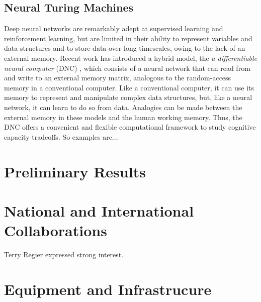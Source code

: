 \documentclass{article}
\begin{document}
\subsection{Neural Turing Machines}
Deep neural networks are remarkably adept at supervised learning and reinforcement learning, but are limited in their ability to represent variables and data structures and to store data over long timescales, owing to the lack of an external memory. Recent work has introduced a hybrid model, the \emph{a differentiable neural computer} (DNC) \cite{graves2014neural, DNC}, which consists of a neural network that can read from and write to an external memory matrix, analogous to the random-access memory in a conventional computer. Like a conventional computer, it can use its memory to represent and manipulate complex data structures, but, like a neural network, it can learn to do so from data. Analogies can be made between the external memory in these models and the human working memory. Thus, the DNC offers a convenient and flexible computational framework to study cognitive capacity tradeoffs. So examples are...

\section{Preliminary Results}

\section{National and International Collaborations}

Terry Regier expressed strong interest.

\section{Equipment and Infrastrucure}




\end{document}
